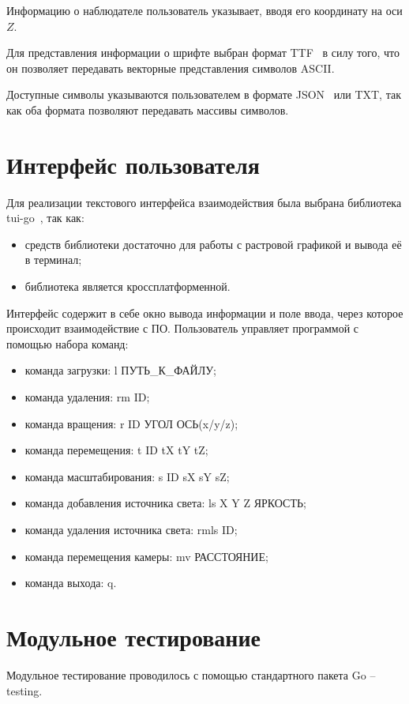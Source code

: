 Информацию о наблюдателе пользователь указывает, вводя его координату на оси $Z$.

Для представления информации о шрифте выбран формат TTF~\cite{ttf} в силу того, что он позволяет передавать векторные представления символов ASCII.

Доступные символы указываются пользователем в формате JSON~\cite{json} или TXT, так как оба формата позволяют передавать массивы символов.

\section{Интерфейс пользователя}

Для реализации текстового интерфейса взаимодействия была выбрана библиотека tui-go~\cite{tui}, так как:

\begin{itemize}
	\item средств библиотеки достаточно для работы с растровой графикой и вывода её в терминал;
	\item библиотека является кроссплатформенной.
\end{itemize}

Интерфейс содержит в себе окно вывода информации и поле ввода, через которое происходит взаимодействие с ПО. Пользователь управляет программой с помощью набора команд:
\begin{itemize}
    \item команда загрузки: l ПУТЬ\_К\_ФАЙЛУ;
    \item команда удаления: rm ID;
    \item команда вращения: r ID УГОЛ ОСЬ(x/y/z);
    \item команда перемещения: t ID tX tY tZ;
    \item команда масштабирования: s ID sX sY sZ;
    \item команда добавления источника света: ls X Y Z ЯРКОСТЬ;
    \item команда удаления источника света: rmls ID;
    \item команда перемещения камеры: mv РАССТОЯНИЕ;
    \item команда выхода: q.
\end{itemize}

\section{Модульное тестирование}

Модульное тестирование проводилось с помощью стандартного пакета Go -- testing. 

